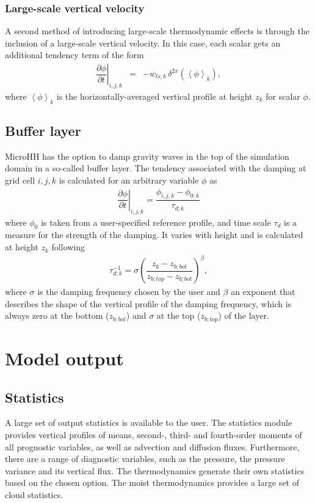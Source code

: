 \documentclass[gmd]{copernicus}
\begin{document}
\subsubsection{Large-scale vertical velocity}
A second method of introducing large-scale thermodynamic effects is through the inclusion of a large-scale vertical velocity. In this case, each scalar gets an additional tendency term of the form
\begin{eqnarray}
\left. \dfrac{\partial \phi}{\partial t}\right|_{i,j,k} & = &  - w_{ls;k}\,\delta^{2x} \left( \left< \phi \right>_k \right),
\end{eqnarray}
where $\left< \phi \right>_k$ is the horizontally-averaged vertical profile at height $z_k$ for scalar $\phi$.

\subsection{Buffer layer}
MicroHH has the option to damp gravity waves in the top of the simulation domain in a so-called buffer layer.  The tendency associated with the damping at grid cell $i,j,k$ is calculated for an arbitrary variable $\phi$ as
\begin{eqnarray}
\left. \dfrac{\partial \phi}{\partial t}\right|_{i,j,k} = \dfrac{\phi_{i,j,k} - \phi_{0;k}}{\tau_{d;k}}
\end{eqnarray}
where $\phi_0$ is taken from a user-specified reference profile, and time scale $\tau_d$ is a measure for the strength of the damping. It varies with height and is calculated at height $z_k$ following
\begin{eqnarray}
\tau_{d;k}^{-1} = \sigma \left( \dfrac{z_k - z_{b;bot} }{z_{b;top} - z_{b;bot}} \right)^\beta,
\end{eqnarray}
where $\sigma$ is the damping frequency chosen by the user and $\beta$ an exponent that describes the shape of the vertical profile of the damping frequency, which is always zero at the bottom ($z_{b;bot}$) and $\sigma$ at the top ($z_{b;top}$)  of the layer.

\section{Model output}
\subsection{Statistics}
A large set of output statistics is available to the user. The statistics module provides vertical profiles of means, second-, third- and fourth-order moments of all prognostic variables, as well as advection and diffusion fluxes. Furthermore, there are a range of diagnostic variables, such as the pressure, the pressure variance and its vertical flux. The thermodynamics generate their own statistics based on the chosen option. The moist thermodynamics provides a large set of cloud statistics.
\end{document}

